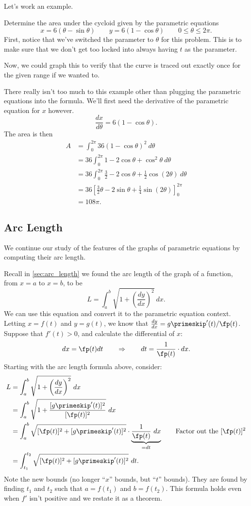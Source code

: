 Let's work an example.

\begin{example}\label{eg_cycloid_area}
Determine the area under the cycloid given by the parametric equations
\[x=6(\theta-\sin\theta)\qquad y=6(1-\cos\theta)\qquad 0\le\theta\le2\pi.\]
\solution
First, notice that we've switched the parameter to $\theta$ for this problem.  This is to make sure that we don't get too locked into always having $t$ as the parameter.

Now, we could graph this to verify that the curve is traced out exactly once for the given range if we wanted to.
 
There really isn't too much to this example other than plugging the parametric equations into the formula.  We'll first need the derivative of the parametric equation for $x$ however.
\[\frac{dx}{d\theta}=6(1-\cos\theta).\]
The area is then
\begin{align*}
A
&=\int_0^{2\pi}36(1-\cos\theta)^2\ d\theta\\
&=36\int_0^{2\pi}1-2\cos\theta+\cos^2\theta\ d\theta\\
&=36\int_0^{2\pi}\frac32-2\cos\theta+\frac12\cos(2\theta)\ d\theta\\
&=36\left[\frac32\theta-2\sin\theta+\frac14\sin(2\theta)\right]_0^{2\pi}\\
&=108\pi.
\end{align*}
\end{example}


\subsection{Arc Length}

We continue our study of the features of the graphs of parametric equations by computing their arc length.

Recall in \autoref{sec:arc_length} we found the arc length of the graph of a function, from $x=a$ to $x=b$, to be
\[L = \int_a^b\sqrt{1+\left(\frac{dy}{dx}\right)^2}\ dx.\]
We can use this equation and convert it to the parametric equation context. Letting $x=f(t)$ and $y=g(t)$, we know that $\frac{dy}{dx} = g\primeskip'(t)/\fp(t)$. Suppose that $f'(t)>0$, and calculate the differential of $x$:
\[dx = \fp(t)dt \qquad \Rightarrow \qquad dt = \frac{1}{\fp(t)}\cdot dx.\]
Starting with the arc length formula above, consider:
\begin{align*}
	L &= \int_a^b\sqrt{1+\left(\frac{dy}{dx}\right)^2}\ dx\\
	&= \int_a^b \sqrt{1+\frac{[g\primeskip'(t)]^2}{[\fp(t)]^2}}\ dx \\
	&= \int_a^b \sqrt{[\fp(t)]^2+[g\primeskip'(t)]^2}\cdot\underbrace{\frac1{\fp(t)}\ dx}_{=dt} \qquad\text{Factor out the $[\fp(t)]^2$} \\
	&= \int_{t_1}^{t_2} \sqrt{[\fp(t)]^2+[g\primeskip'(t)]^2}\ dt.\\
\end{align*}
Note the new bounds (no longer ``$x$'' bounds, but ``$t$'' bounds). They are found by finding $t_1$ and $t_2$ such that $a= f(t_1)$ and $b=f(t_2)$. This formula holds even when $f'$ isn't positive and we restate it as a theorem.

